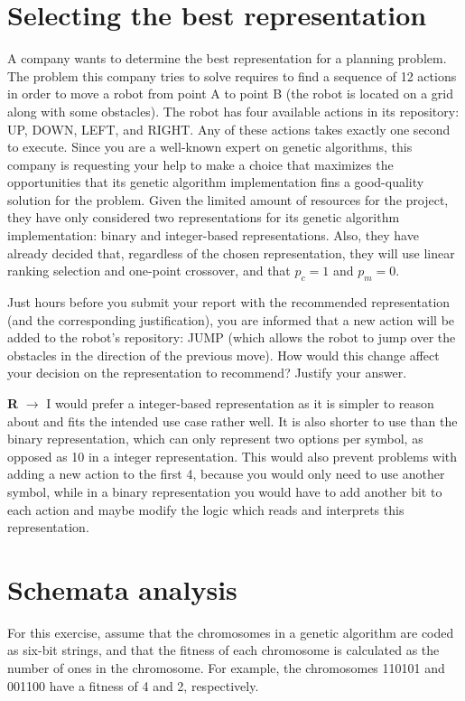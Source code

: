 \documentclass{article}
\begin{document}
\section{Selecting the best representation}
A company wants to determine the best representation for a planning problem. The problem this company tries to solve requires to find a sequence of 12 actions in order to move a robot from point A to point
B (the robot is located on a grid along with some obstacles). The robot has four available actions in its repository: UP, DOWN, LEFT, and RIGHT. Any of these actions takes exactly one second to execute. Since you are a well-known expert on genetic algorithms, this company is requesting your help to make a choice that maximizes the opportunities that its genetic algorithm implementation fins a good-quality solution for the problem. Given the limited amount of resources for the project, they have only considered two representations for its genetic algorithm implementation: binary and integer-based representations. Also, they have already decided that, regardless of the chosen representation, they will use linear ranking selection and one-point crossover, and that $p_c = 1$ and $p_m = 0$.

Just hours before you submit your report with the recommended representation (and the corresponding justification), you are informed that a new action will be added to the robot’s repository: JUMP (which allows the robot to jump over the obstacles in the direction of the previous move). How would this change affect your decision on the representation to recommend? Justify your answer.

\textbf{R} $\rightarrow$ I would prefer a integer-based representation as it is simpler to reason about and fits the intended use case rather well. It is also shorter to use than the binary representation, which can only represent two options per symbol, as opposed as 10 in a integer representation. This would also prevent problems with adding a new action to the first 4, because you would only need to use another symbol, while in a binary representation you would have to add another bit to each action and maybe modify the logic which reads and interprets this representation.


\section{Schemata analysis}
For this exercise, assume that the chromosomes in a genetic algorithm are coded as six-bit strings, and that the fitness of each chromosome is calculated as the number of ones in the chromosome. For example, the
chromosomes 110101 and 001100 have a fitness of 4 and 2, respectively.
\end{document}
